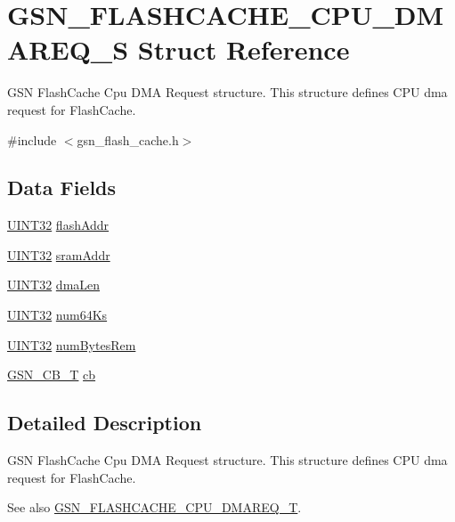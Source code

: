 \hypertarget{a00075}{
\section{GSN\_\-FLASHCACHE\_\-CPU\_\-DMAREQ\_\-S Struct Reference}
\label{a00075}
}


GSN FlashCache Cpu DMA Request structure. This structure defines CPU dma request for FlashCache.  




{\ttfamily \#include $<$gsn\_\-flash\_\-cache.h$>$}

\subsection*{Data Fields}
\begin{DoxyCompactItemize}
\item 
\hyperlink{a00660_gae1e6edbbc26d6fbc71a90190d0266018}{UINT32} \hyperlink{a00075_af3fae94809cef9bd6c5e106b985a95d3}{flashAddr}
\item 
\hyperlink{a00660_gae1e6edbbc26d6fbc71a90190d0266018}{UINT32} \hyperlink{a00075_a6b728d16c94f762108480a6f8f1e211c}{sramAddr}
\item 
\hyperlink{a00660_gae1e6edbbc26d6fbc71a90190d0266018}{UINT32} \hyperlink{a00075_a49c34bebf3515efecb961f34f2057f34}{dmaLen}
\item 
\hyperlink{a00660_gae1e6edbbc26d6fbc71a90190d0266018}{UINT32} \hyperlink{a00075_ac426fe6d32fa612df45ffc6472739a1f}{num64Ks}
\item 
\hyperlink{a00660_gae1e6edbbc26d6fbc71a90190d0266018}{UINT32} \hyperlink{a00075_a6f85c420fc2b2cec091bb54272d34a74}{numBytesRem}
\item 
\hyperlink{a00036}{GSN\_\-CB\_\-T} \hyperlink{a00075_acd7c4f09c02b8b1b8b4f2eb4a7c14b50}{cb}
\end{DoxyCompactItemize}


\subsection{Detailed Description}
GSN FlashCache Cpu DMA Request structure. This structure defines CPU dma request for FlashCache. 

\begin{DoxySeeAlso}{See also}
\hyperlink{a00646_ga83166ab55332496f41890f891c0be919}{GSN\_\-FLASHCACHE\_\-CPU\_\-DMAREQ\_\-T}. 
\end{DoxySeeAlso}


